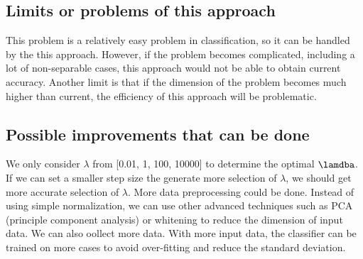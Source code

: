 \documentclass{article}
\begin{document}
\subsection{Limits or problems of this approach}
This problem is a relatively easy problem in classification, so it can be handled by the this approach. However, if the problem becomes complicated, including a lot of non-separable cases, this approach would not be able to obtain current accuracy. Another limit is that if the dimension of the problem becomes much higher than current, the efficiency of this approach will be problematic.
\subsection{Possible improvements that can be done}
We only consider $\lambda$ from [0.01, 1, 100, 10000] to determine the optimal $\lamdba$. If we can set a smaller step size the generate more selection of $\lambda$, we should get more accurate selection of $\lambda$.
More data preprocessing could be done. Instead of using simple normalization, we can use other advanced techniques such as PCA (principle component analysis) or whitening to reduce the dimension of input data.
We can also oollect more data. With more input data, the classifier can be trained on more cases to avoid over-fitting and reduce the standard deviation.
\end{document}
